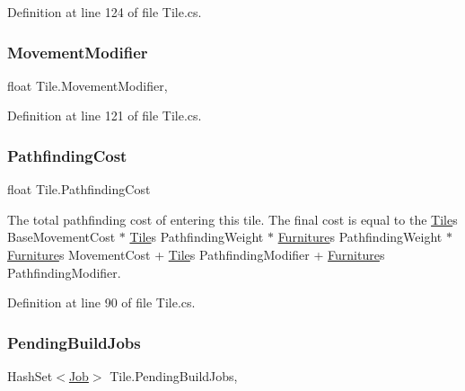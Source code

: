Definition at line 124 of file Tile.\+cs.

\mbox{\label{class_tile_abb2003a763a47e688f96edf88633ace7}} 
\subsubsection{\texorpdfstring{Movement\+Modifier}{MovementModifier}}
{\footnotesize\ttfamily float Tile.\+Movement\+Modifier\hspace{0.3cm}{\ttfamily [get]}, {\ttfamily [set]}}



Definition at line 121 of file Tile.\+cs.

\mbox{\label{class_tile_a6dbcb3c830e1bb4447ed95a010bdf244}} 
\subsubsection{\texorpdfstring{Pathfinding\+Cost}{PathfindingCost}}
{\footnotesize\ttfamily float Tile.\+Pathfinding\+Cost\hspace{0.3cm}{\ttfamily [get]}}



The total pathfinding cost of entering this tile. The final cost is equal to the \hyperlink{class_tile}{Tile}\textquotesingle{}s Base\+Movement\+Cost $\ast$ \hyperlink{class_tile}{Tile}\textquotesingle{}s Pathfinding\+Weight $\ast$ \hyperlink{class_furniture}{Furniture}\textquotesingle{}s Pathfinding\+Weight $\ast$ \hyperlink{class_furniture}{Furniture}\textquotesingle{}s Movement\+Cost + \hyperlink{class_tile}{Tile}\textquotesingle{}s Pathfinding\+Modifier + \hyperlink{class_furniture}{Furniture}\textquotesingle{}s Pathfinding\+Modifier. 



Definition at line 90 of file Tile.\+cs.

\mbox{\label{class_tile_aa23e1ff55199851f33739caee50495fc}} 
\subsubsection{\texorpdfstring{Pending\+Build\+Jobs}{PendingBuildJobs}}
{\footnotesize\ttfamily Hash\+Set$<$\hyperlink{class_job}{Job}$>$ Tile.\+Pending\+Build\+Jobs\hspace{0.3cm}{\ttfamily [get]}, {\ttfamily [set]}}



